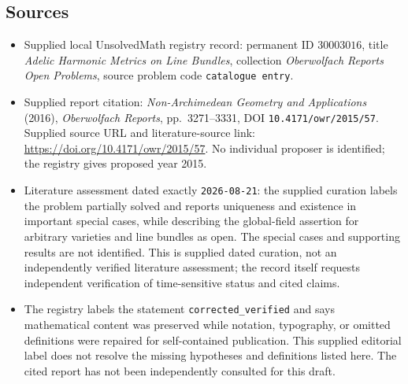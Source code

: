 \documentclass[11pt]{article}
\begin{document}
\subsection{Sources}
\begin{itemize}
\item Supplied local UnsolvedMath registry record: permanent ID \(30003016\), title \emph{Adelic Harmonic Metrics on Line Bundles}, collection \emph{Oberwolfach Reports Open Problems}, source problem code \texttt{catalogue entry}.
\item Supplied report citation: \emph{Non-Archimedean Geometry and Applications} (2016), \emph{Oberwolfach Reports}, pp.~3271--3331, DOI \texttt{10.4171/owr/2015/57}. Supplied source URL and literature-source link: \url{https://doi.org/10.4171/owr/2015/57}. No individual proposer is identified; the registry gives proposed year 2015.
\item Literature assessment dated exactly \texttt{2026-08-21}: the supplied curation labels the problem partially solved and reports uniqueness and existence in important special cases, while describing the global-field assertion for arbitrary varieties and line bundles as open. The special cases and supporting results are not identified. This is supplied dated curation, not an independently verified literature assessment; the record itself requests independent verification of time-sensitive status and cited claims.
\item The registry labels the statement \texttt{corrected\_verified} and says mathematical content was preserved while notation, typography, or omitted definitions were repaired for self-contained publication. This supplied editorial label does not resolve the missing hypotheses and definitions listed here. The cited report has not been independently consulted for this draft.
\end{itemize}
\end{document}
